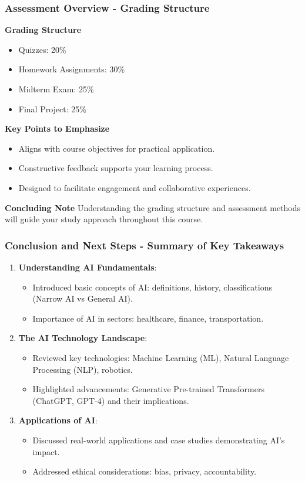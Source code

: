 \documentclass[aspectratio=169]{beamer}
\begin{document}
\begin{frame}[fragile]
    \frametitle{Assessment Overview - Grading Structure}
    \textbf{Grading Structure}
    \begin{itemize}
        \item Quizzes: 20\%
        \item Homework Assignments: 30\%
        \item Midterm Exam: 25\%
        \item Final Project: 25\%
    \end{itemize}
    
    \textbf{Key Points to Emphasize}
    \begin{itemize}
        \item Aligns with course objectives for practical application.
        \item Constructive feedback supports your learning process.
        \item Designed to facilitate engagement and collaborative experiences.
    \end{itemize}
    
    \textbf{Concluding Note}
    Understanding the grading structure and assessment methods will guide your study approach throughout this course.
\end{frame}

\begin{frame}[fragile]
    \frametitle{Conclusion and Next Steps - Summary of Key Takeaways}
    \begin{enumerate}
        \item \textbf{Understanding AI Fundamentals}:
        \begin{itemize}
            \item Introduced basic concepts of AI: definitions, history, classifications (Narrow AI vs General AI).
            \item Importance of AI in sectors: healthcare, finance, transportation.
        \end{itemize}
        
        \item \textbf{The AI Technology Landscape}:
        \begin{itemize}
            \item Reviewed key technologies: Machine Learning (ML), Natural Language Processing (NLP), robotics.
            \item Highlighted advancements: Generative Pre-trained Transformers (ChatGPT, GPT-4) and their implications.
        \end{itemize}

        \item \textbf{Applications of AI}:
        \begin{itemize}
            \item Discussed real-world applications and case studies demonstrating AI's impact.
            \item Addressed ethical considerations: bias, privacy, accountability.
        \end{itemize}
    \end{enumerate}
\end{frame}
\end{document}
